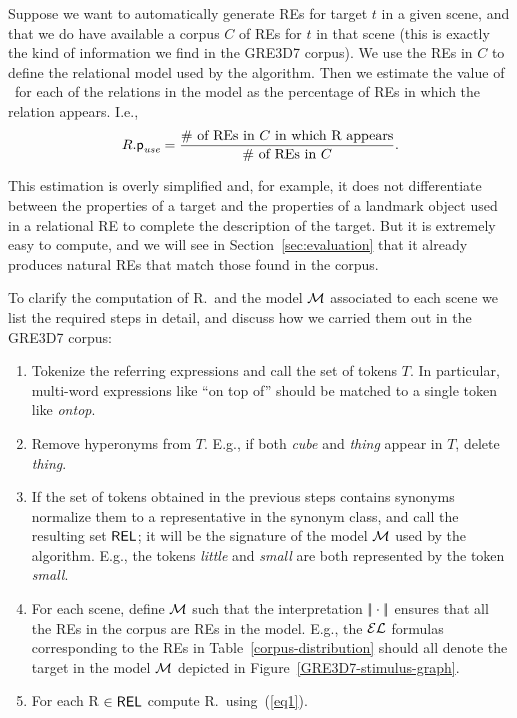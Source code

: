Suppose we want to automatically generate REs for target $t$ in a given scene, and that we do have available a corpus $C$ of REs for $t$ in that scene (this is exactly the kind of information we find in the GRE3D7 corpus).  We use the REs in $C$ to define the relational model 
used by the algorithm.  Then we estimate the value of \puse\ for each of the relations in the model as the percentage of REs in which the relation appears.  I.e., 
\begin{equation}\label{eq1}
R.\textsf{p}_\textit{use} = \frac{\# \mbox{ of REs in $C$ in which R appears}}{\# \mbox{ of REs in $C$}}.
\end{equation}

\noindent
This estimation is overly simplified and, for example, it does not differentiate between the properties of a target and the properties of a landmark object used in a relational RE to complete the description of the target.  But it is extremely easy to compute, and we will see in Section~\ref{sec:evaluation} that it already produces natural REs that match those found in the corpus. 

To clarify the computation of R.\puse\ and the model $\mathcal{M}$ associated to each scene we list the required steps in detail, and discuss how we carried them out in the GRE3D7 corpus:

\vspace*{-.4cm}
\begin{enumerate}
\item Tokenize the referring expressions and call the set of tokens $T$. In particular, multi-word expressions like ``on top of'' should be matched to a single token like \emph{ontop}.\\[-1.9em]

\item Remove hyperonyms from $T$. E.g., if both \emph{cube} and \emph{thing} appear in $T$, delete \emph{thing}.\\[-2em]

\item If the set of tokens obtained in the previous steps contains synonyms normalize them to a representative in the synonym class, and call the resulting set $\textsf{REL}$; it will be the signature of the model $\mathcal{M}$ used by the algorithm. E.g., the tokens \emph{little} and \emph{small} are both represented by the token \emph{small}.\\[-1.9em]

\item For each scene, define $\mathcal{M}$ such that the interpretation $|\!|\cdot|\!|$ ensures that all the REs in the corpus are REs in the model. E.g., the $\mathcal{EL}$ formulas corresponding to the REs in Table~\ref{corpus-distribution} should all denote the target in the model $\mathcal{M}$ depicted in 
Figure~\ref{GRE3D7-stimulus-graph}.\\[-1.9em]

\item For each R $\in \textsf{REL}$ compute R.\puse\ using~(\ref{eq1}).\\[-1.9em]

\end{enumerate}

